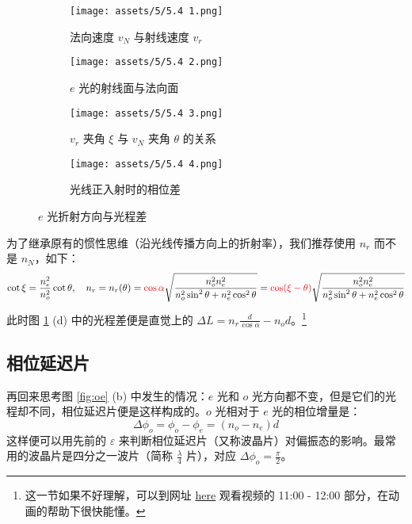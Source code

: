\documentclass[UTF8]{report}
\theoremstyle{MyLineTheoremStyle} %
\theoremstyle{MyBlockTheoremStyle} %
\theoremstyle{MySubsubsectionStyle} %
\begin{document}
\begin{figure}[H]\centering
\begin{subfigure}[b]{0.2\columnwidth}\centering
    \texttt{[image: assets/5/5.4 1.png]}
    \caption{法向速度 $v_N$ 与射线速度 $v_r$}
\end{subfigure}\hfill
\begin{subfigure}[b]{0.22\columnwidth}\centering
    \texttt{[image: assets/5/5.4 2.png]}
    \caption{$e$ 光的射线面与法向面}
\end{subfigure}
\begin{subfigure}[b]{0.25\columnwidth}\centering
    \texttt{[image: assets/5/5.4 3.png]}
    \caption{$v_r$ 夹角 $\xi$ 与 $v_N$ 夹角 $\theta$ 的关系}
\end{subfigure}
\begin{subfigure}[b]{0.32\columnwidth}\centering
    \texttt{[image: assets/5/5.4 4.png]}
    \caption{光线正入射时的相位差}
\end{subfigure}
\caption{$e$ 光折射方向与光程差}
\label{fig: e光}
\end{figure}
为了继承原有的惯性思维（沿光线传播方向上的折射率），我们推荐使用 $n_r$ 而不是 $n_N$，如下：
\begin{equation}
    \cot \xi = \frac{n_e^2}{n_o^2} \cot \theta,\quad n_r = n_r(\theta) = {\color{red} \cos \alpha}\sqrt{ \frac{n_o^2n_e^2}{n_o^2\sin^2 \theta + n_e^2\cos^2 \theta} } = 
    {\color{red} \cos (\xi - \theta)}\sqrt{ \frac{n_o^2n_e^2}{n_o^2\sin^2 \theta + n_e^2\cos^2 \theta} } 
\end{equation}
此时图 \ref{fig: e光} (d) 中的光程差便是直觉上的 $\Delta L = n_r\frac{d}{\cos \alpha} - n_od$。\footnote{这一节如果不好理解，可以到网址 \href{https://www.bilibili.com/video/BV1VDpUeCEvv}{here} 观看视频的 11:00 - 12:00 部分，在动画的帮助下很快能懂。}


\subsection{相位延迟片}
再回来思考图 \ref{fig:oe} (b) 中发生的情况：$e$ 光和 $o$ 光方向都不变，但是它们的光程却不同，相位延迟片便是这样构成的。$o$ 光相对于 $e$ 光的相位增量是：
\begin{equation}
\Delta \phi_o = \phi_o - \phi_e = (n_o - n_e)d
\end{equation}
这样便可以用先前的 $\varepsilon$ 来判断相位延迟片（又称波晶片）对偏振态的影响。最常用的波晶片是四分之一波片（简称 $\frac{\lambda}{4}$ 片），对应 $\Delta \phi_o = \frac{\pi}{2}$。
\end{document}
